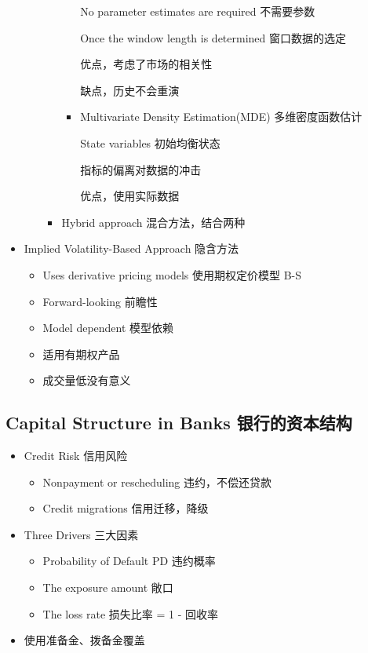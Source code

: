 \documentclass[a4paper,6pt,twoside,openany]{article}
\begin{document}
\begin{itemize}
\begin{itemize}
\begin{itemize}
\begin{itemize}
        \par No parameter estimates are required 不需要参数
        \par Once the window length is determined 窗口数据的选定
        \par 优点，考虑了市场的相关性
        \par 缺点，历史不会重演
      \item Multivariate Density Estimation(MDE) 多维密度函数估计
        \par State variables 初始均衡状态
        \par 指标的偏离对数据的冲击
        \par 优点，使用实际数据
      \end{itemize}
    \item Hybrid approach 混合方法，结合两种
    \end{itemize}
  \end{itemize}
\item Implied Volatility-Based Approach 隐含方法
  \begin{itemize}
  \item Uses derivative pricing models 使用期权定价模型 B-S
  \item Forward-looking 前瞻性
  \item Model dependent 模型依赖
  \item 适用有期权产品
  \item 成交量低没有意义
  \end{itemize}
\end{itemize}
\subsection{Capital Structure in Banks 银行的资本结构}
\begin{itemize}
\item Credit Risk 信用风险
  \begin{itemize}
  \item Nonpayment or rescheduling 违约，不偿还贷款
  \item Credit migrations 信用迁移，降级
  \end{itemize}
\item Three Drivers 三大因素
  \begin{itemize}
  \item Probability of Default PD 违约概率
  \item The exposure amount 敞口
  \item The loss rate 损失比率 = 1 - 回收率
  \end{itemize}
  \item 使用准备金、拨备金覆盖
\end{itemize}
\end{document}
